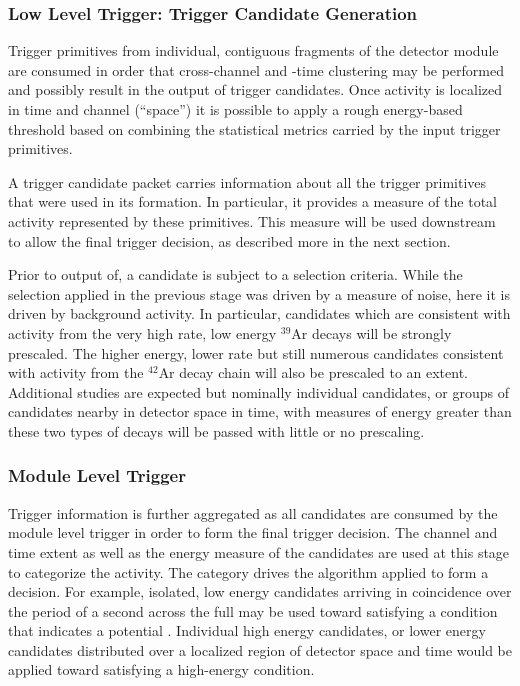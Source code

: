 
\subsubsection{Low Level Trigger: Trigger Candidate Generation}

Trigger primitives from individual, contiguous fragments of the detector
module are consumed in order that cross-channel and -time clustering may be
performed and possibly result in the output of trigger candidates.
Once activity is localized in time and channel (``space'') it is
possible to apply a rough energy-based threshold based on combining the
statistical metrics carried by the input trigger primitives.

A trigger candidate packet carries information about all the trigger
primitives that were used in its formation. 
In particular, it provides a measure of the total activity represented
by these primitives.
This measure will be used downstream to allow the final trigger
decision, as described more in the next section.

Prior to output of, a candidate is subject to a selection criteria.
While the selection applied in the previous stage was driven by a
measure of noise, here it is driven by background activity.  
In particular, candidates which are consistent with activity from the
very high rate, low energy $^{39}$Ar decays will be strongly prescaled. 
The higher energy, lower rate but still numerous candidates consistent
with activity from the $^{42}$Ar decay chain will also be prescaled to
an extent. 
Additional studies are expected but nominally individual candidates, or
groups of candidates nearby in detector space in time, with measures of
energy greater than these two types of decays will be passed with little
or no prescaling.


\subsubsection{Module Level Trigger}

Trigger information is further aggregated as all candidates are consumed
by the module level trigger in order to form the final trigger decision. 
The channel and time extent as well as the energy measure of the
candidates are used at this stage to categorize the activity. 
The category drives the algorithm applied to form a decision.
For example, isolated, low energy candidates arriving in coincidence
over the period of a second across the full  may be used toward
satisfying a condition that indicates a potential . 
Individual high energy candidates, or lower energy candidates
distributed over a localized region of detector space and time would be
applied toward satisfying a high-energy condition. 

